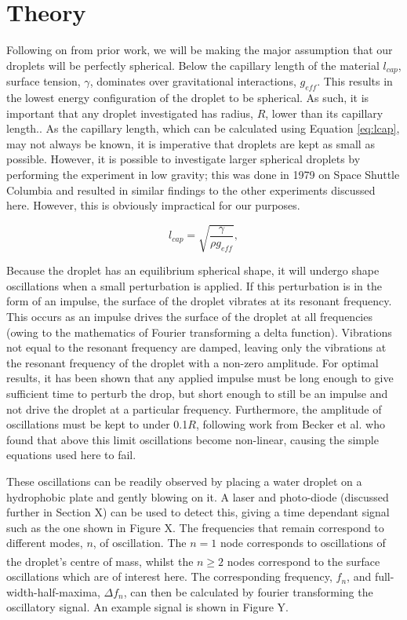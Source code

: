 \documentclass{physics_article_B}
\begin{document}
\section{Theory\label{sect:theory}}

Following on from prior work, we will be making the major assumption that our droplets will be perfectly spherical. Below the capillary length of the material $l_{cap}$, surface tension, $\gamma$, dominates over gravitational interactions, $g_{eff}$. This results in the lowest energy configuration of the droplet to be spherical. As such, it is important that any droplet investigated has radius, $R$, lower than its capillary length.. As the capillary length, which can be calculated using Equation \ref{eq:lcap}, may not always be known, it is imperative that droplets are kept as small as possible. However, it is possible to investigate larger spherical droplets by performing the experiment in low gravity; this was done in 1979\cite{holt} on Space Shuttle Columbia and resulted in similar findings to the other experiments discussed here. However, this is obviously impractical for our purposes.

\begin{equation} 
\label{eq:lcap}
l_{cap} = \sqrt{\frac{\gamma }{\rho g_{eff} }} , 
\end{equation}
    
Because the droplet has an equilibrium spherical shape, it will undergo shape oscillations when a small perturbation is applied\cite{oscillate}. If this perturbation is in the form of an impulse, the surface of the droplet vibrates at its resonant frequency. This occurs as an impulse drives the surface of the droplet at all frequencies (owing to the mathematics of Fourier transforming a delta function). Vibrations not equal to the resonant frequency are damped, leaving only the vibrations at the resonant frequency of the droplet with a non-zero amplitude. For optimal results, it has been shown that any applied impulse must be long enough to give sufficient time to perturb the drop, but short enough to still be an impulse and not drive the droplet at a particular frequency\cite{temperton}. Furthermore, the amplitude of oscillations must be kept to under 0.1$R$, following work from Becker et al. who found that above this limit oscillations become non-linear, causing the simple equations used here to fail\cite{becker}.
    
These oscillations can be readily observed by placing a water droplet on a hydrophobic plate and gently blowing on it. A laser and photo-diode (discussed further in Section X) can be used to detect this, giving a time dependant signal such as the one shown in Figure X. The frequencies that remain correspond to different modes, $n$, of oscillation. The $n=1$ node corresponds to oscillations of the droplet's centre of mass\textsuperscript{\cite{miller}}, whilst the $n\geq2$ nodes correspond to the surface oscillations which are of interest here. The corresponding frequency, $f_n$, and full-width-half-maxima, $\Delta f_n$, can then be calculated by fourier transforming the oscillatory signal. An example signal is shown in Figure Y. 
\end{document}
